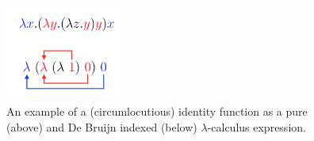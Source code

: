 \begin{figure}[h]

%

\centering
\includegraphics[width=4cm]{Figures/DeBruijnIndex}

\caption{An example of a (circumlocutious) identity function as a pure (above) and De Bruijn indexed (below) $\lambda$-calculus expression.}
\label{fig:db_example}
\end{figure}
